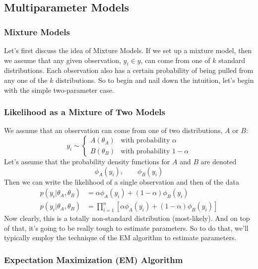 \documentclass[12pt]{article}
\theoremstyle{plain}
\theoremstyle{definition}
\theoremstyle{remark}
\begin{document}
\newpage




\newpage
\subsection{Multiparameter Models}



\newpage
\subsubsection{Mixture Models}

Let's first discuss the idea of Mixture Models. If we set up a mixture
model, then we assume that any given observation, $y_i \in y$, can
come from one of $k$ standard distributions. Each observation
also has a certain probability of being pulled from any one of
the $k$ distributions. So to begin and nail down the intuition,
let's begin with the simple two-parameter case.

\subsubsection{Likelihood as a Mixture of Two Models}

We assume that an observation can come from one of two distributions,
$A$ or $B$:
\[ y_i\sim\begin{cases}A(\theta_A)&\text{with probability $\alpha$} \\
      B(\theta_B) & \text{with probability $1-\alpha$} \end{cases} \]
Let's assume that the probability density functions for $A$ and $B$
are denoted
   \[ \phi_A(y_i), \qquad \phi_B(y_i) \]
Then we can write the likelihood of a single observation and then
of the data
\begin{align*}
   p(y_i | \theta_A, \theta_B) &= \alpha \phi_A(y_i) + (1-\alpha)
      \phi_B(y_i) \\
   p(y_i | \theta_A, \theta_B) &= \prod^n_{i=1}
      \left[ \alpha \phi_A(y_i) + (1-\alpha)
	 \phi_B(y_i) \right]
\end{align*}
Now clearly, this is a totally non-standard distribution (most-likely).
And on top of that, it's going to be really tough to estimate
parameters. So to do that, we'll typically employ the technique
of the EM algorithm to estimate parameters.

\subsubsection{Expectation Maximization (EM) Algorithm}
\end{document}
